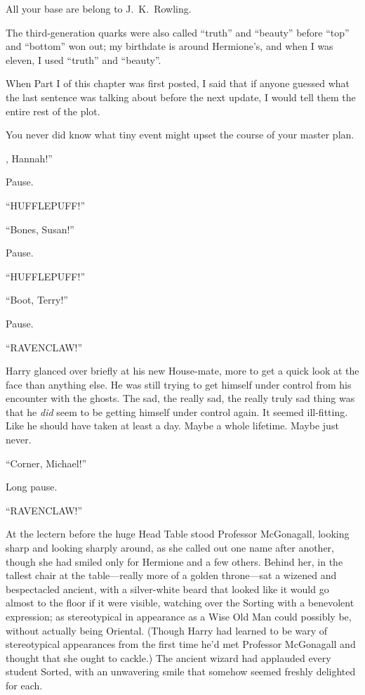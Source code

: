 
\begin{chapterOpeningAuthorNote}
All your base are belong to J.~K.~Rowling.



The third-generation quarks were also called “truth” and “beauty” before “top” and “bottom” won out; my birthdate is around Hermione's, and when I was eleven, I used “truth” and “beauty”.

When Part I of this chapter was first posted, I said that if anyone guessed what the last sentence was talking about before the next update, I would tell them the entire rest of the plot.
\end{chapterOpeningAuthorNote}
\begin{chapterOpeningQuote}
You never did know what tiny event might upset the course of your master plan.
\end{chapterOpeningQuote}

, Hannah!”

\hplettrineextrapara
Pause.

“HUFFLEPUFF!”

“Bones, Susan!”

Pause.

“HUFFLEPUFF!”

“Boot, Terry!”

Pause.

“RAVENCLAW!”

Harry glanced over briefly at his new House-mate, more to get a quick look at the face than anything else. He was still trying to get himself under control from his encounter with the ghosts. The sad, the really sad, the really truly sad thing was that he \emph{did} seem to be getting himself under control again. It seemed ill-fitting. Like he should have taken at least a day. Maybe a whole lifetime. Maybe just never.

“Corner, Michael!”

Long pause.

“RAVENCLAW!”

At the lectern before the huge Head Table stood Professor McGonagall, looking sharp and looking sharply around, as she called out one name after another, though she had smiled only for Hermione and a few others. Behind her, in the tallest chair at the table—really more of a golden throne—sat a wizened and bespectacled ancient, with a silver-white beard that looked like it would go almost to the floor if it were visible, watching over the Sorting with a benevolent expression; as stereotypical in appearance as a Wise Old Man could possibly be, without actually being Oriental. (Though Harry had learned to be wary of stereotypical appearances from the first time he’d met Professor McGonagall and thought that she ought to cackle.) The ancient wizard had applauded every student Sorted, with an unwavering smile that somehow seemed freshly delighted for each.

